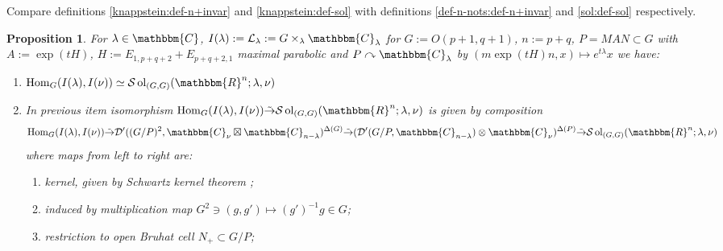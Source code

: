 \documentclass{article}
\newcommand{\assign}{:=}
\newcommand{\tmop}[1]{\ensuremath{\operatorname{#1}}}
\numberwithin{definition}{section}
\numberwithin{lemma}{section}
\newtheorem{proposition}{Proposition}
\numberwithin{proposition}{section}
{\theorembodyfont{\rmfamily}\newtheorem{remark}{Remark}
\numberwithin{remark}{section}
}
\begin{document}
\begin{remark}
  Compare definitions \ref{knappstein:def-n+invar} and
  \ref{knappstein:def-sol} with definitions \ref{def-n-nots:def-n+invar} and
  \ref{sol:def-sol} respectively.
\end{remark}

\begin{proposition}
  \label{knappstein:prop-1}For $\lambda \in \mathbbm{C}$, $I ( \lambda)
  \assign \mathcal{L}_{\lambda} \assign G \times_{\lambda}
  \mathbbm{C}_{\lambda}$ for $G \assign O ( p + 1, q + 1)$, $n \assign p + q$,
  $P = M A N \subset G$ with $A \assign \exp ( t H)$, $H \assign E_{1, p + q +
  2} + E_{p + q + 2, 1}$ maximal parabolic and $P \curvearrowright
  \mathbbm{C}_{\lambda}$ by $( m \exp ( t H) n, x) \mapsto e^{t \lambda} x$ we
  have:
  \begin{enumerate}
    \item $\tmop{Hom}_G ( I ( \lambda), I ( \nu)) \simeq \mathcal{S}
    \tmop{ol}_{( G, G)} ( \mathbbm{R}^n ; \lambda, \nu)$
    
    \item In previous item isomorphism $\tmop{Hom}_G ( I ( \lambda), I ( \nu))
    \tilde{\rightarrow} \mathcal{S} \tmop{ol}_{( G, G)} ( \mathbbm{R}^n ;
    \lambda, \nu)$ is given by composition
    \[ \tmop{Hom}_G ( I ( \lambda), I ( \nu)) \tilde{\rightarrow} \mathcal{D}'
       ( ( G / P)^2, \mathbbm{C}_{\nu} \boxtimes \mathbbm{C}_{n -
       \lambda})^{\Delta ( G)} \tilde{\rightarrow} ( \mathcal{D}' ( G / P,
       \mathbbm{C}_{n - \lambda}) \otimes \mathbbm{C}_{\nu})^{\Delta ( P)}
       \tilde{\rightarrow} \mathcal{S} \tmop{ol}_{( G, G)} ( \mathbbm{R}^n ;
       \lambda, \nu) \]
    where maps from left to right are:
    \begin{enumerate}
      \item kernel, given by Schwartz kernel theorem {\cite[thm.
      5.2.1]{hormander1983analysis}};
      
      \item induced by multiplication map $G^2 \ni ( g, g') \mapsto ( g')^{-
      1} g \in G$;
      
      \item restriction to open Bruhat cell $N_+ \subset G / P$;
    \end{enumerate}
  \end{enumerate}
\end{proposition}
\end{document}
